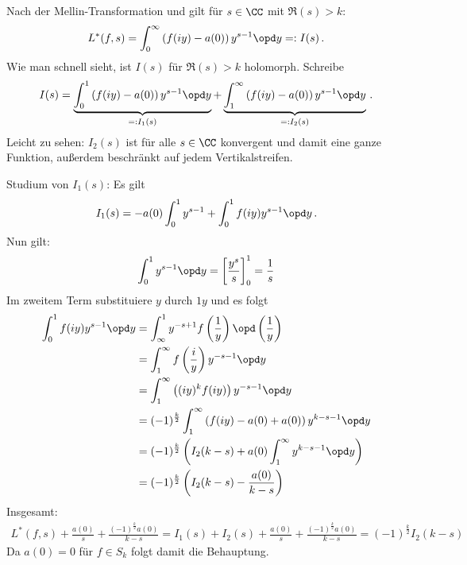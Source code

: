 \begin{bewe}
Nach der Mellin-Transformation und  gilt für $s \in \CC$ mit $\Re(s) > k$:
\[
	L^*(f,s) = \int_0^\infty \left( f(iy) - a(0) \right) y^{s-1} \opd y =: I(s)
	\,.
\]
Wie man schnell sieht, ist $I(s)$ für $\Re(s) > k$ holomorph. Schreibe 
\[
	I(s) = \underbrace{\int_0^1 \left( f(iy) - a(0) \right) y^{s-1} \opd y}_{=: I_1(s)} + \underbrace{\int_1^\infty \left( f(iy) - a(0) \right) y^{s-1} \opd y}_{=: I_2(s)}
	\,.
\]
Leicht zu sehen: $I_2(s)$ ist für alle $s \in \CC$ konvergent und damit eine ganze Funktion, außerdem beschränkt auf jedem Vertikalstreifen.

Studium von $I_1(s)$: Es gilt
\[
	I_1(s) = - a(0) \int_0^1 y^{s-1} + \int_0^1 f(iy) y^{s-1} \opd y
	\,.
\]
Nun gilt:
\[
	\int_0^1 y^{s-1} \opd y = \left[ \frac {y^s}s \right]_0^1 = \frac 1s
\]
Im zweitem Term substituiere $y$ durch $1y$ und es folgt
\begin{align*}
	\int_0^1 f(iy) y^{s-1} \opd y
	&= \int_\infty^1 y^{-s+1} f \left( \frac 1y \right) \opd \left( \frac 1y \right) \\
	&= \int_1^\infty f \left( \frac iy \right) y^{-s-1} \opd y \\
	&= \int_1^\infty \left( (iy)^k f(iy) \right) y^{-s-1} \opd y \\
	&= (-1)^{\frac k2} \int_1^\infty \left( f(iy) - a(0) + a(0) \right) y^{k-s-1} \opd y \\
	&= (-1)^{\frac k2} \left( I_2(k-s) + a(0) \int_1^\infty y^{k-s-1} \opd y \right) \\
	&= (-1)^{\frac k2} \left( I_2(k-s) - \frac {a(0)}{k-s} \right)
\end{align*}
Insgesamt:
\begin{align*}
	L^*(f,s) + \frac {a(0)}s + \frac {(-1)^{\frac k2} a(0)}{k-s} = I_1(s) + I_2(s) + \frac {a(0)}s + \frac {(-1)^{\frac k2} a(0)}{k-s} = (-1)^{\frac k2} I_2(k-s)
\end{align*}
Da $a(0) = 0$ für $f \in S_k$ folgt damit die Behauptung.
\end{bewe}
